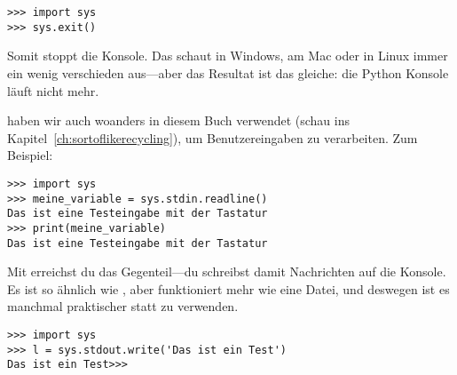 \begin{Verbatim}[frame=single]
>>> import sys
>>> sys.exit()
\end{Verbatim}

Somit stoppt die Konsole. Das schaut in Windows, am Mac oder in Linux immer ein wenig verschieden aus---aber das Resultat ist das gleiche: die Python Konsole läuft nicht mehr.

 haben wir auch woanders in diesem Buch verwendet (schau ins Kapitel~\ref{ch:sortoflikerecycling}), um Benutzereingaben zu verarbeiten. Zum Beispiel:

\begin{Verbatim}[frame=single]
>>> import sys
>>> meine_variable = sys.stdin.readline()
Das ist eine Testeingabe mit der Tastatur
>>> print(meine_variable)
Das ist eine Testeingabe mit der Tastatur
\end{Verbatim}

Mit  erreichst du das Gegenteil---du schreibst damit Nachrichten auf die Konsole. Es ist so ähnlich wie , aber funktioniert mehr wie eine Datei, und deswegen ist es manchmal praktischer  statt  zu verwenden.

\begin{Verbatim}[frame=single]
>>> import sys
>>> l = sys.stdout.write('Das ist ein Test')
Das ist ein Test>>>
\end{Verbatim}


